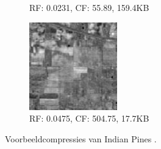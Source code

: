 \begin{figure}[H]
\begin{subfigure}{0.48\textwidth}
  \caption{RF: 0.0231, CF: 55.89, 159.4KB}
\end{subfigure}
\begin{subfigure}{0.48\textwidth}
  \centering
  \includegraphics[scale=1]{images/example_compression_Indian_Pines_0_05.png}
  \caption{RF: 0.0475, CF: 504.75, 17.7KB}
\end{subfigure}
\caption{Voorbeeldcompressies van Indian Pines \cite{ref:ehu_aviris_indian_pines}.}
\end{figure}

